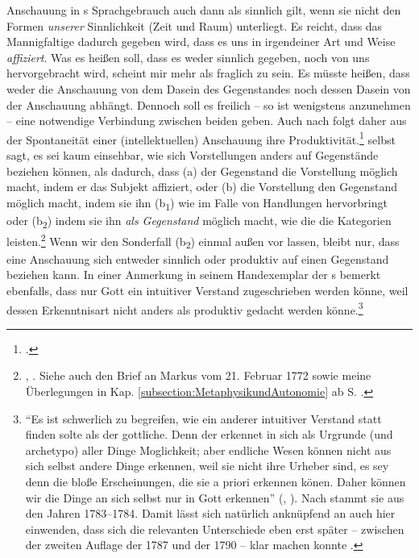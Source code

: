 Anschauung in s Sprachgebrauch auch
dann als sinnlich gilt, wenn sie nicht den Formen \emph{unserer} Sinnlichkeit
(Zeit und Raum) unterliegt. Es reicht, dass das Mannigfaltige dadurch gegeben
wird, dass es uns in irgendeiner Art und Weise \emph{affiziert}. Was es
heißen soll, dass es weder sinnlich gegeben, noch von uns hervorgebracht wird,
scheint mir mehr als fraglich zu sein. Es müsste heißen, dass weder
die Anschauung von dem Dasein des Gegenstandes noch dessen Dasein von
der Anschauung abhängt. Dennoch soll es freilich -- so ist wenigstens
anzunehmen -- eine notwendige Verbindung zwischen beiden geben. Auch nach
folgt daher aus der Spontaneität einer (intellektuellen) Anschauung ihre
Produktivität.\footnote{\cite[Vgl.][144]{Duesing:NaturteleologieundMetaphysikbeiKantundHegel1990}.}
 selbst sagt, es sei kaum einsehbar, wie sich
Vorstellungen anders auf Gegenstände beziehen können, als dadurch, dass (a) der
Gegenstand die Vorstellung möglich macht, indem er das Subjekt affiziert, oder
(b) die Vorstellung den Gegenstand möglich macht, indem sie ihn
(b\textsubscript{1}) wie im Falle von Handlungen hervorbringt oder
(b\textsubscript{2}) indem sie ihn \emph{als Gegenstand} möglich macht, wie die die Kategorien
leisten.\footnote{\cite[Vgl.][\S~14]{Kant:KritikderreinenVernunft2003},
\cite[][III: 104.5--17]{Kant:GesammelteWerke1900ff.}. Siehe auch den Brief an
Markus  vom 21. Februar 1772
\parencite[][X: 124\,f.]{Kant:GesammelteWerke1900ff.} sowie meine Überlegungen
in Kap. \ref{subsection:MetaphysikundAutonomie} ab S.
\pageref{AutonomiedesVerstandes}.} Wenn wir den Sonderfall (b\textsubscript{2})
einmal außen vor lassen, bleibt nur, dass eine Anschauung sich entweder sinnlich
oder produktiv auf einen Gegenstand beziehen kann. In einer Anmerkung in seinem
Handexemplar der 
s bemerkt  ebenfalls, dass
nur Gott ein intuitiver Verstand zugeschrieben werden könne, weil dessen
Erkenntnisart nicht anders als produktiv gedacht werden
könne.\footnote{\enquote{Es ist schwerlich zu begreifen, wie ein anderer
intuitiver Verstand statt finden solte als der gottliche. Denn der erkennet in
sich als Urgrunde (und archetypo) aller Dinge Moglichkeit; aber endliche Wesen
können nicht aus sich selbst andere Dinge erkennen, weil sie nicht ihre Urheber
sind, es sey denn die bloße Erscheinungen, die sie a priori erkennen könen. 	  	  	 
Daher können wir die Dinge an sich selbst nur in Gott
erkennen} \mkbibparens{\cite[][]{Kant:Reflexionen1900ff.},
\cite[][XVII: 433.16--21]{Kant:GesammelteWerke1900ff.}}. Nach
 stammt sie aus den Jahren 1783--1784. Damit lässt sich
natürlich anknüpfend an  auch
hier einwenden, dass  sich die relevanten Unterschiede eben
erst später -- zwischen der zweiten Auflage der  1787 und der  1790 --  klar machen
konnte \parencite[vgl.][\pno~177,
Anm.]{Foerster:DieBedeutungvonSS7677deremphKritikderUrteilskraftfuerdieEntwicklungdernachkantischenPhilosophieTeil12002}.}

